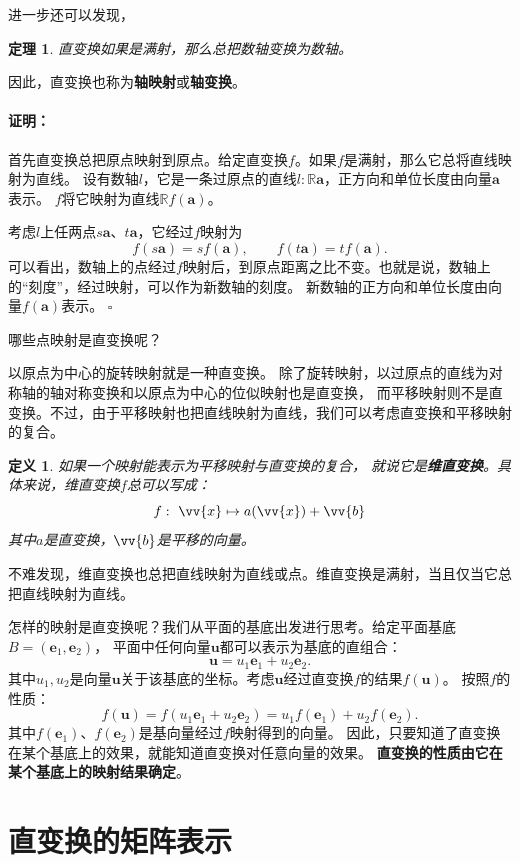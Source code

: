 \documentclass[12pt,UTF8]{ctexbook}
\newtheorem{df}{定义}[section]
\newtheorem{tm}{定理}[section]
\renewenvironment{proof}{\paragraph{\textbf{证明：}}}{\hfill$\square$}
\begin{document}
进一步还可以发现，
\begin{tm}
    直变换如果是满射，那么总把数轴变换为数轴。
\end{tm}
因此，直变换也称为\textbf{轴映射}或\textbf{轴变换}。
\begin{proof}
    首先直变换总把原点映射到原点。给定直变换$f$。如果$f$是满射，那么它总将直线映射为直线。
    设有数轴$l$，它是一条过原点的直线$l: \mathbb{R}\mathbf{a}$，正方向和单位长度由向量$\mathbf{a}$表示。
    $f$将它映射为直线$\mathbb{R}f(\mathbf{a})$。

    考虑$l$上任两点$s\mathbf{a}$、$t\mathbf{a}$，它经过$f$映射为
    $$ f(s\mathbf{a}) = sf(\mathbf{a}),\qquad f(t\mathbf{a}) = tf(\mathbf{a}).$$
    可以看出，数轴上的点经过$f$映射后，到原点距离之比不变。也就是说，数轴上的“刻度”，经过映射，可以作为新数轴的刻度。
    新数轴的正方向和单位长度由向量$f(\mathbf{a})$表示。
\end{proof}

哪些点映射是直变换呢？

以原点为中心的旋转映射就是一种直变换。
除了旋转映射，以过原点的直线为对称轴的轴对称变换和以原点为中心的位似映射也是直变换，
而平移映射则不是直变换。不过，由于平移映射也把直线映射为直线，我们可以考虑直变换和平移映射的复合。

\begin{df}
    如果一个映射能表示为平移映射与直变换的复合，
    就说它是\textbf{维直变换}。具体来说，维直变换$f$总可以写成：
    $$ f: \,\, \vv{x} \mapsto a(\vv{x}) + \vv{b} $$
    其中$a$是直变换，$\vv{b}$是平移的向量。
\end{df}
不难发现，维直变换也总把直线映射为直线或点。维直变换是满射，当且仅当它总把直线映射为直线。

怎样的映射是直变换呢？我们从平面的基底出发进行思考。给定平面基底$B = (\mathbf{e}_1, \mathbf{e}_2)$，
平面中任何向量$\mathbf{u}$都可以表示为基底的直组合：
$$ \mathbf{u} = u_1 \mathbf{e}_1 + u_2 \mathbf{e}_2.$$
其中$u_1, u_2$是向量$\mathbf{u}$关于该基底的坐标。考虑$\mathbf{u}$经过直变换$f$的结果$f(\mathbf{u})$。
按照$f$的性质：
$$ f(\mathbf{u}) = f(u_1 \mathbf{e}_1 + u_2 \mathbf{e}_2) = u_1 f(\mathbf{e}_1) + u_2 f(\mathbf{e}_2).$$
其中$f(\mathbf{e}_1)$、$f(\mathbf{e}_2)$是基向量经过$f$映射得到的向量。
因此，只要知道了直变换在某个基底上的效果，就能知道直变换对任意向量的效果。
\textbf{直变换的性质由它在某个基底上的映射结果确定}。

\section{直变换的矩阵表示}
\end{document}

